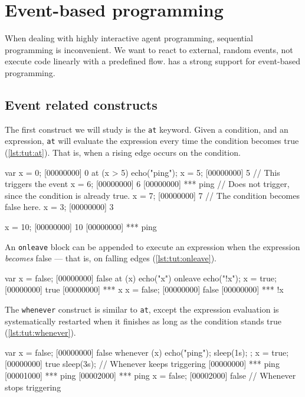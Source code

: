 
\chapter{Event-based programming}
\label{sec:tut:event-prog}

When dealing with highly interactive agent programming, sequential
programming is inconvenient. We want to react to external, random
events, not execute code linearly with a predefined flow. \us has a
strong support for event-based programming.

\section{Event related constructs}

The first construct we will study is the \lstinline|at| keyword. Given
a condition, and an expression, \lstinline|at| will evaluate the
expression every time the condition becomes true (\autoref{lst:tut:at}). That is,
when a rising edge occurs on the condition.

\begin{urbiscript}[caption=Using \lstinline{at}, label=lst:tut:at]
var x = 0;
[00000000] 0
at (x > 5)
  echo("ping");
x = 5;
[00000000] 5
// This triggers the event
x = 6;
[00000000] 6
[00000000] *** ping
// Does not trigger, since the condition is already true.
x = 7;
[00000000] 7
// The condition becomes false here.
x = 3;
[00000000] 3

x = 10;
[00000000] 10
[00000000] *** ping
\end{urbiscript}

An \lstinline|onleave| block can be appended to execute an expression
when the expression \emph{becomes} false --- that is, on falling edges
(\autoref{lst:tut:onleave}).

\begin{urbiscript}[caption=Using \lstinline{at ... onleave}, label=lst:tut:onleave]
var x = false;
[00000000] false
at (x)
  echo("x")
onleave
  echo("!x");
x = true;
[00000000] true
[00000000] *** x
x = false;
[00000000] false
[00000000] *** !x
\end{urbiscript}

The \lstinline|whenever| construct is similar to \lstinline|at|,
except the expression evaluation is systematically restarted when it
finishes as long as the condition stands true (\autoref{lst:tut:whenever}).

\begin{urbiscript}[caption=Using \lstinline{whenever}, label=lst:tut:whenever]
var x = false;
[00000000] false
whenever (x)
{
  echo("ping");
  sleep(1s);
};
x = true;
[00000000] true
sleep(3s);
// Whenever keeps triggering
[00000000] *** ping
[00001000] *** ping
[00002000] *** ping
x = false;
[00002000] false
// Whenever stops triggering
\end{urbiscript}

